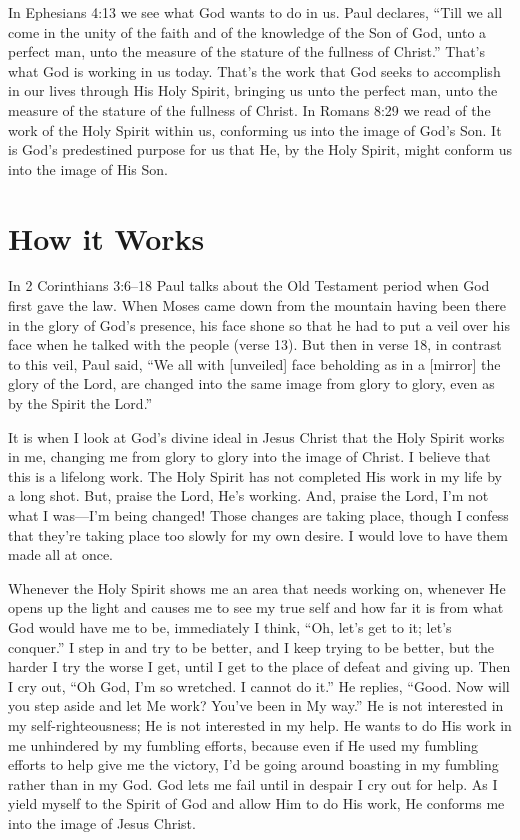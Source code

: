 In Ephesians 4:13 we see what God wants to do in us.
Paul declares, “Till we all come in the unity of the faith and
of the knowledge of the Son of God, unto a perfect man,
unto the measure of the stature of the fullness of Christ.”
That’s what God is working in us today. That’s the work
that God seeks to accomplish in our lives through His Holy
Spirit, bringing us unto the perfect man, unto the measure
of the stature of the fullness of Christ. In Romans 8:29 we
read of the work of the Holy Spirit within us, conforming us
into the image of God’s Son. It is God’s predestined purpose
for us that He, by the Holy Spirit, might conform us into the
image of His Son.


\section*{How it Works}

In 2 Corinthians 3:6–18 Paul talks about the Old Testament
period when God first gave the law. When Moses
came down from the mountain having been there in the
glory of God’s presence, his face shone so that he had to put
a veil over his face when he talked with the people (verse
13). But then in verse 18, in contrast to this veil, Paul said,
“We all with [unveiled] face beholding as in a [mirror] the
glory of the Lord, are changed into the same image from
glory to glory, even as by the Spirit the Lord.”

It is when I look at God’s divine ideal in Jesus Christ
that the Holy Spirit works in me, changing me from glory
to glory into the image of Christ. I believe that this is a lifelong
work. The Holy Spirit has not completed His work
in my life by a long shot. But, praise the Lord, He’s working.
And, praise the Lord, I’m not what I was—I’m being
changed! Those changes are taking place, though I confess
that they’re taking place too slowly for my own desire. I
would love to have them made all at once.

Whenever the Holy Spirit shows me an area that needs
working on, whenever He opens up the light and causes me
to see my true self and how far it is from what God would
have me to be, immediately I think, “Oh, let’s get to it; let’s
conquer.” I step in and try to be better, and I keep trying to
be better, but the harder I try the worse I get, until I get to
the place of defeat and giving up. Then I cry out, “Oh
God, I’m so wretched. I cannot do it.” He replies, “Good.
Now will you step aside and let Me work? You’ve been in
My way.” He is not interested in my self-righteousness; He
is not interested in my help. He wants to do His work in
me unhindered by my fumbling efforts, because even if He
used my fumbling efforts to help give me the victory, I’d be
going around boasting in my fumbling rather than in my
God. God lets me fail until in despair I cry out for help. As
I yield myself to the Spirit of God and allow Him to do His
work, He conforms me into the image of Jesus Christ.


